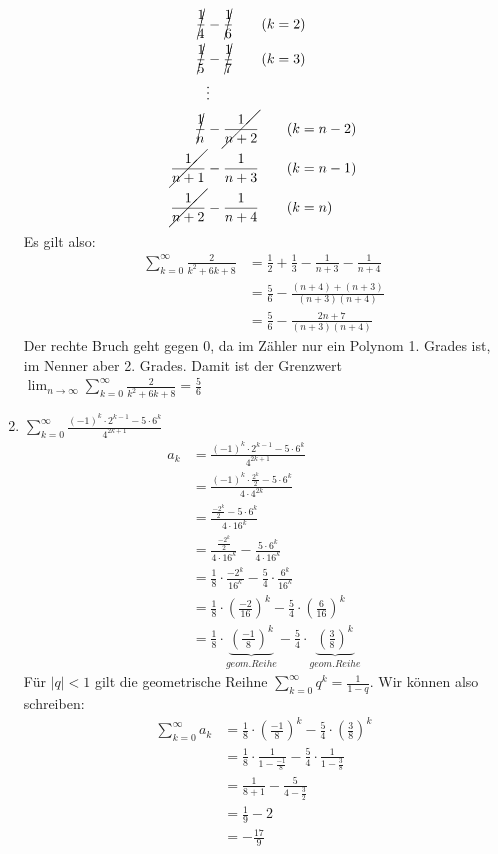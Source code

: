 \documentclass[11pt, a4paper]{article}
\newcommand{\abs}[1]{\left\lvert#1\right\rvert}
\begin{document}
\begin{enumerate}
\begin{align*}
			\cancel{\frac{1}{4}} &- \cancel{\frac{1}{6}} \tag{$k=2$} \\
			\cancel{\frac{1}{5}} &- \cancel{\frac{1}{7}} \tag{$k=3$} \\
			& \vdots \\
			\cancel{\frac{1}{n}} &- \cancel{\frac{1}{n+2}} \tag{$k=n-2$} \\
			\cancel{\frac{1}{n+1}} &- \frac{1}{n+3} \tag{$k=n-1$} \\
			\cancel{\frac{1}{n+2}} &- \frac{1}{n+4} \tag{$k=n$} \\
		\end{align*}
		Es gilt also:
		\begin{align*}
			\sum_{k=0}^\infty \frac{2}{k^2+6k+8} &= \frac{1}{2} + \frac{1}{3} - \frac{1}{n+3} - \frac{1}{n+4} \\
			&= \frac{5}{6} - \frac{(n+4) + (n+3)}{(n+3)(n+4)} \\
			&= \frac{5}{6} - \frac{2n+7}{(n+3)(n+4)}
		\end{align*}
		Der rechte Bruch geht gegen 0, da im Zähler nur ein Polynom 1. Grades ist, im Nenner aber 2. Grades. Damit ist der Grenzwert $\lim_{n \rightarrow \infty} \sum_{k=0}^\infty \frac{2}{k^2+6k+8} = \frac{5}{6}$
	\item $\sum_{k=0}^\infty \frac{(-1)^k \cdot 2^{k-1} - 5 \cdot 6^k}{4^{2k+1}}$
		\begin{align*}
			a_k &= \frac{(-1)^k \cdot 2^{k-1} - 5 \cdot 6^k}{4^{2k+1}} \\
			&= \frac{(-1)^k \cdot \frac{2^k}{2} - 5 \cdot 6^k}{4 \cdot 4^{2k}} \\
			&= \frac{\frac{-2^k}{2} - 5 \cdot 6^k}{4 \cdot 16^k} \\
			&= \frac{\frac{-2^k}{2}}{4 \cdot 16^k} - \frac{5 \cdot 6^k}{4 \cdot 16^k} \\
			&= \frac{1}{8} \cdot \frac{-2^k}{16^k} - \frac{5}{4} \cdot \frac{6^k}{16^k} \\
			&= \frac{1}{8} \cdot \left( \frac{-2}{16} \right)^k - \frac{5}{4} \cdot \left( \frac{6}{16} \right)^k \\
			&= \frac{1}{8} \cdot \underbrace{ \left( \frac{-1}{8} \right)^k}_{geom. Reihe} - \frac{5}{4} \cdot \underbrace{ \left( \frac{3}{8} \right)^k}_{geom. Reihe}
		\end{align*}
		Für $\abs{q}<1$ gilt die geometrische Reihne $\sum_{k=0}^\infty q^k = \frac{1}{1-q}$. Wir können also schreiben:
		\begin{align*}
			\sum_{k=0}^\infty a_k &= \frac{1}{8} \cdot \left( \frac{-1}{8} \right)^k - \frac{5}{4} \cdot \left( \frac{3}{8} \right)^k \\
			&= \frac{1}{8} \cdot \frac{1}{1-\frac{-1}{8}} - \frac{5}{4} \cdot \frac{1}{1-\frac{3}{8}} \\
			&= \frac{1}{8+1} - \frac{5}{4-\frac{3}{2}} \\
			&= \frac{1}{9} - 2 \\
			&= -\frac{17}{9}
		\end{align*}
\end{enumerate}
\end{document}
